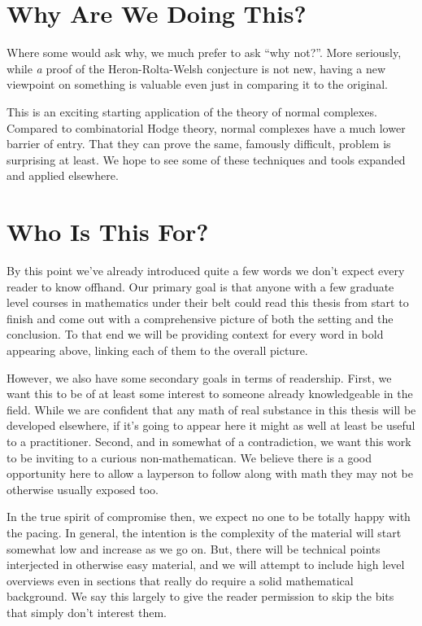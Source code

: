 \documentclass[12pt,oneside]{../../sfsuthesis}
\begin{document}
\section{Why Are We Doing This?}

Where some would ask why, we much prefer to ask ``why not?''.
More seriously, while \textit{a} proof of the Heron-Rolta-Welsh conjecture is not new, having a new viewpoint on something is valuable even just in comparing it to the original.

This is an exciting starting application of the theory of normal complexes.
Compared to combinatorial Hodge theory, normal complexes have a much lower barrier of entry.
That they can prove the same, famously difficult, problem is surprising at least.
We hope to see some of these techniques and tools expanded and applied elsewhere.

\section{Who Is This For?}

By this point we've already introduced quite a few words we don't expect every reader to know offhand.
Our primary goal is that anyone with a few graduate level courses in mathematics under their belt could read this thesis from start to finish and come out with a comprehensive picture of both the setting and the conclusion.
To that end we will be providing context for every word in bold appearing above, linking each of them to the overall picture.

However, we also have some secondary goals in terms of readership.
First, we want this to be of at least some interest to someone already knowledgeable in the field.
While we are confident that any math of real substance in this thesis will be developed elsewhere, if it's going to appear here it might as well at least be useful to a practitioner.
Second, and in somewhat of a contradiction, we want this work to be inviting to a curious non-mathematican.
We believe there is a good opportunity here to allow a layperson to follow along with math they may not be otherwise usually exposed too.

In the true spirit of compromise then, we expect no one to be totally happy with the pacing.
In general, the intention is the complexity of the material will start somewhat low and increase as we go on.
But, there will be technical points interjected in otherwise easy material, and we will attempt to include high level overviews even in sections that really do require a solid mathematical background.
We say this largely to give the reader permission to skip the bits that simply don't interest them.
\end{document}

